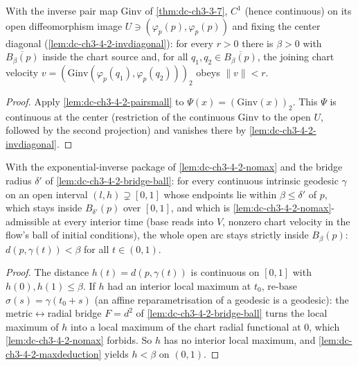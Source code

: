 \begin{lemma}
  \label{lem:dc-ch3-4-2-velsmall}


  With the inverse pair map $\mathrm{Ginv}$ of \cref{thm:dc-ch3-3-7}, $C^1$ (hence
  continuous) on its open diffeomorphism image $U\ni(\varphi_p(p),\varphi_p(p))$ and
  fixing the center diagonal (\cref{lem:dc-ch3-4-2-invdiagonal}): for every $r>0$
  there is $\beta>0$ with $\overline{B_\beta(p)}$ inside the chart source and, for all
  $q_1,q_2\in\overline{B_\beta(p)}$, the joining chart velocity
  $v=(\mathrm{Ginv}(\varphi_p(q_1),\varphi_p(q_2)))_2$ obeys $\|v\|<r$.
\end{lemma}
\begin{proof}
  \sketch

  Apply \cref{lem:dc-ch3-4-2-pairsmall} to $\Psi(x)=(\mathrm{Ginv}(x))_2$. This
  $\Psi$ is continuous at the center (restriction of the continuous $\mathrm{Ginv}$
  to the open $U$, followed by the second projection) and vanishes there by
  \cref{lem:dc-ch3-4-2-invdiagonal}.
\end{proof}

\begin{lemma}
  \label{lem:dc-ch3-4-2-interior}


  With the exponential-inverse package of \cref{lem:dc-ch3-4-2-nomax} and the bridge radius $\delta'$ of
  \cref{lem:dc-ch3-4-2-bridge-ball}: for every continuous intrinsic geodesic $\gamma$ on an open interval
  $(l,h)\supsetneq[0,1]$ whose endpoints lie within $\beta\le\delta'$ of $p$, which stays inside
  $B_{\delta'}(p)$ over $[0,1]$, and which is \cref{lem:dc-ch3-4-2-nomax}-admissible at every interior
  time (base reads into $V$, nonzero chart velocity in the flow's ball of initial conditions), the whole
  open arc stays strictly inside $B_\beta(p)$: $d(p,\gamma(t))<\beta$ for all $t\in(0,1)$.
\end{lemma}
\begin{proof}
  \sketch

  The distance $h(t)=d(p,\gamma(t))$ is continuous on $[0,1]$ with $h(0),h(1)\le\beta$. If $h$ had an
  interior local maximum at $t_0$, re-base $\sigma(s)=\gamma(t_0+s)$ (an affine reparametrisation of a
  geodesic is a geodesic): the metric$\leftrightarrow$radial bridge $F=d^2$ of
  \cref{lem:dc-ch3-4-2-bridge-ball} turns the local maximum of $h$ into a local maximum of the chart
  radial functional at $0$, which \cref{lem:dc-ch3-4-2-nomax} forbids. So $h$ has no interior local
  maximum, and \cref{lem:dc-ch3-4-2-maxdeduction} yields $h<\beta$ on $(0,1)$.
\end{proof}

